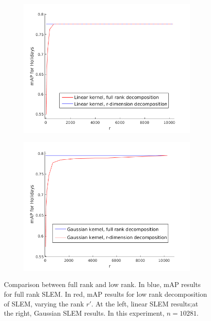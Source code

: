 \begin{figure}[!h]
\centering
\begin{subfigure}[b]{0.48\textwidth}
\includegraphics[width=\textwidth]{linear_decomposition_nolog.png}
\end{subfigure}
\begin{subfigure}[b]{0.48\textwidth}
\includegraphics[width=\textwidth]{rbf_decomposition_nolog.png}
\end{subfigure}
\caption{Comparison between full rank and low rank. In blue, mAP results for full rank SLEM. In red, mAP results for low rank decomposition of SLEM, varying the rank $r'$.
At the left, linear SLEM results;at the right, Gaussian SLEM results. In this experiment, $n=10281$.}
\label{no.ker.vs.linear2}
\end{figure}

